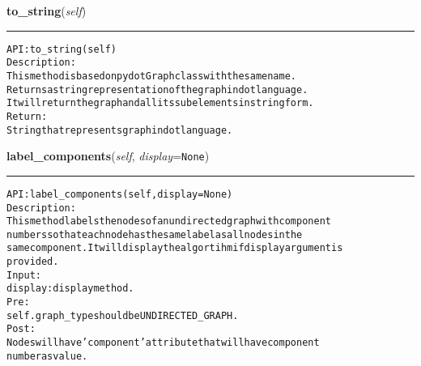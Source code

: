     \label{coinor:gimpy:graph:Graph:to_string}

    \vspace{0.5ex}

\hspace{.8\funcindent}\begin{boxedminipage}{\funcwidth}

    \raggedright \textbf{to\_string}(\textit{self})

    \vspace{-1.5ex}

    \rule{\textwidth}{0.5\fboxrule}
\setlength{\parskip}{2ex}
\begin{alltt}

API: to\_string(self)
Description:
This method is based on pydot Graph class with the same name.
Returns a string representation of the graph in dot language.
It will return the graph and all its subelements in string form.
Return:
    String that represents graph in dot language.
\end{alltt}

\setlength{\parskip}{1ex}
    \end{boxedminipage}

    \label{coinor:gimpy:graph:Graph:label_components}

    \vspace{0.5ex}

\hspace{.8\funcindent}\begin{boxedminipage}{\funcwidth}

    \raggedright \textbf{label\_components}(\textit{self}, \textit{display}={\tt None})

    \vspace{-1.5ex}

    \rule{\textwidth}{0.5\fboxrule}
\setlength{\parskip}{2ex}
\begin{alltt}

API: label\_components(self, display=None)
Description:
This method labels the nodes of an undirected graph with component
numbers so that each node has the same label as all nodes in the
same component. It will display the algortihm if display argument is
provided.
Input:
    display: display method.
Pre:
    self.graph\_type should be UNDIRECTED\_GRAPH.
Post:
    Nodes will have 'component' attribute that will have component
    number as value.
\end{alltt}

\setlength{\parskip}{1ex}
    \end{boxedminipage}

